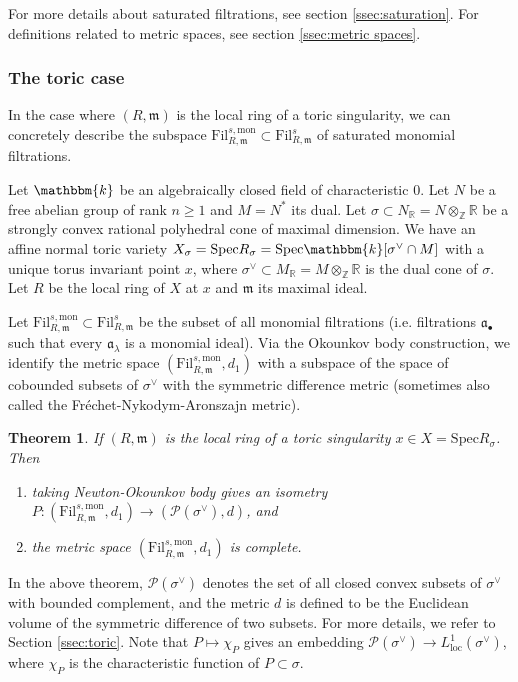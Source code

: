 \documentclass[11pt, leqno]{amsart}%
\theoremstyle{plain}
\newtheorem{theorem}{Theorem}[section]
\theoremstyle{definition}
\theoremstyle{remark}
\newcommand{\cP}{\mathcal{P}}
\newcommand{\bR}{\mathbb{R}}
\newcommand{\bZ}{\mathbb{Z}}
\newcommand{\fa}{\mathfrak{a}}
\newcommand{\fm}{\mathfrak{m}}
\newcommand{\Spec}{\mathrm{Spec}}
\newcommand{\loc}{\mathrm{loc}}
\newcommand{\bk}{\mathbbm{k}}
\newcommand{\Fil}{\mathrm{Fil}}
\numberwithin{equation}{section}
\begin{document}
For more details about saturated filtrations, see section \ref{ssec:saturation}. For definitions related to metric spaces, see section \ref{ssec:metric spaces}. 
	
\subsubsection{The toric case}

In the case where $(R,\fm)$ is the local ring of a toric singularity, we can concretely describe the subspace $\Fil^{s,\mathrm{mon}}_{R,\fm}\subset \Fil^s_{R,\fm}$ of saturated monomial filtrations.

Let $\bk$ be an algebraically closed field of characteristic $0$. Let $N$ be a free abelian group of rank $n\ge 1$ and $M=N^*$ its dual. Let $\sigma\subset N_\bR=N\otimes_\bZ \bR$ be a strongly convex rational polyhedral cone of maximal dimension. We have an affine normal toric variety $X_\sigma=\Spec R_\sigma=\Spec \bk[\sigma^\vee\cap M]$ with a unique torus invariant point $x$, where $\sigma^\vee\subset M_\bR=M\otimes_\bZ \bR$ is the dual cone of $\sigma$. Let $R$ be the local ring of $X$ at $x$ and $\fm$ its maximal ideal.

Let $\Fil^{s,\mathrm{mon}}_{R,\fm}\subset\Fil^s_{R,\fm}$  be the subset of all monomial filtrations (i.e. filtrations $\fa_\bullet$ such that every $\fa_\lambda$ is a monomial ideal). Via the Okounkov body construction, we identify the metric space $(\Fil^{s,\mathrm{mon}}_{R,\fm},d_1)$ with a subspace of the space of cobounded subsets of $\sigma^\vee$ with the symmetric difference metric (sometimes also called the Fr\'echet-Nykodym-Aronszajn metric).

\begin{theorem}\label{thm:toric metric}
    If $(R,\fm)$ is the local ring of a toric singularity $x\in X=\Spec R_\sigma$. Then
    \begin{enumerate}
        \item taking Newton-Okounkov body gives an isometry $P:(\Fil^{s,\mathrm{mon}}_{R,\fm},d_1)\to (\cP(\sigma^\vee),d)$,
        and

        \item the metric space $(\Fil^{s,\mathrm{mon}}_{R,\fm},d_1)$ is complete.
    \end{enumerate}
\end{theorem}

In the above theorem, $\cP(\sigma^\vee)$ denotes the set of all closed convex subsets of $\sigma^\vee$ with bounded complement, and the metric $d$ is defined to be the Euclidean volume of the symmetric difference of two subsets. For more details, we refer to Section \ref{ssec:toric}. Note that $P\mapsto \chi_P$ gives an embedding $\cP(\sigma^\vee)\to L^1_\loc(\sigma^\vee)$, where $\chi_P$ is the characteristic function of $P\subset \sigma$. 
	
\end{document}
